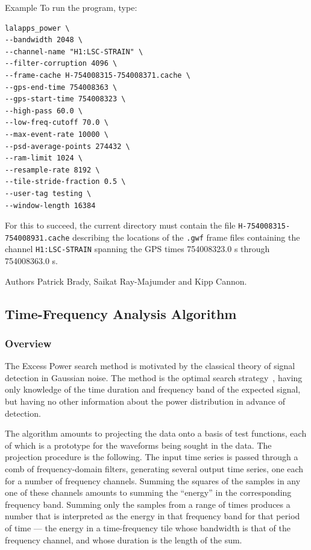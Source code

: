 \documentclass[10pt]{article}
\newenvironment{entry}%
{\begin{list}{}{\renewcommand{\makelabel}[1]%
{\parbox[b]{\labelwidth}{\makebox[0pt][l]{\textbf{##1}}\\}}%
\setlength{\labelwidth}{1em}%
\setlength{\labelsep}{1em}%
\setlength{\leftmargin}{2em}%
\setlength{\topsep}{\medskipamount}%
\setlength{\itemsep}{\medskipamount}%
\setlength{\parsep}{\medskipamount}%
\setlength{\listparindent}{0pt}}}
{\end{list}}
\begin{document}
\begin{entry}
\begin{entry}
\end{entry}


\item[Example]
To run the program, type:
\begin{verbatim}
lalapps_power \
--bandwidth 2048 \
--channel-name "H1:LSC-STRAIN" \
--filter-corruption 4096 \
--frame-cache H-754008315-754008371.cache \
--gps-end-time 754008363 \
--gps-start-time 754008323 \
--high-pass 60.0 \
--low-freq-cutoff 70.0 \
--max-event-rate 10000 \
--psd-average-points 274432 \
--ram-limit 1024 \
--resample-rate 8192 \
--tile-stride-fraction 0.5 \
--user-tag testing \
--window-length 16384
\end{verbatim}
For this to succeed, the current directory must contain the file
\texttt{H-754008315-754008931.cache} describing the locations of the
\texttt{.gwf} frame files containing the channel \verb|H1:LSC-STRAIN|
spanning the GPS times 754008323.0 s through 754008363.0 s.

\item[Authors]
Patrick Brady, Saikat Ray-Majumder and Kipp Cannon.  
\end{entry}


\subsection{Time-Frequency Analysis Algorithm}


\subsubsection{Overview}


The Excess Power search method is motivated by the classical theory of
signal detection in Gaussian noise.  The method is the optimal search
strategy~\cite{anderson2001}, having only knowledge of the time duration
and frequency band of the expected signal,  but having no other information
about the power distribution in advance of detection.

The algorithm amounts to projecting the data onto a basis of test
functions, each of which is a prototype for the waveforms being sought in
the data.  The projection procedure is the following.  The input time
series is passed through a comb of frequency-domain filters, generating
several output time series, one each for a number of frequency channels.
Summing the squares of the samples in any one of these channels amounts to
summing the ``energy'' in the corresponding frequency band.  Summing only
the samples from a range of times produces a number that is interpreted as
the energy in that frequency band for that period of time --- the energy in
a time-frequency tile whose bandwidth is that of the frequency channel, and
whose duration is the length of the sum.
\end{document}

